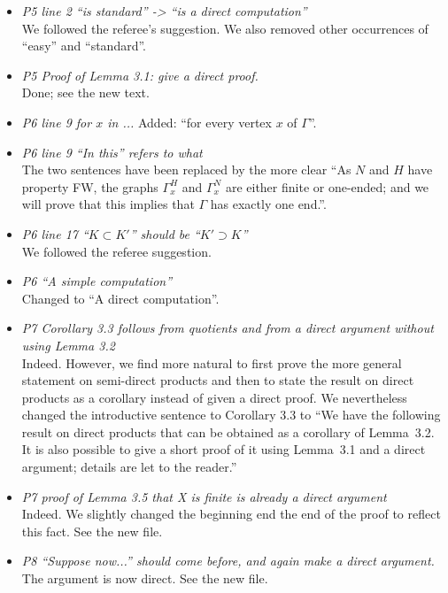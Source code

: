 \documentclass[english,a4paper]{article}
\begin{document}
\begin{itemize}
%
\item\textit{P5 line 2 “is standard” -> “is a direct computation”}\\
We followed the referee's suggestion. We also removed other occurrences of ``easy'' and ``standard''.
%
\item\textit{P5 Proof of Lemma 3.1: give a direct proof.}\\
Done; see the new text.
%
\item\textit{P6 line 9 for $x$ in ...}
Added: ``for every vertex $x$ of $\Gamma$''.
%
\item\textit{P6 line 9 ``In this'' refers to what}\\
The two sentences have been replaced by the more clear ``As $N$ and $H$ have property FW, the graphs $\Gamma_x^H$ and $\Gamma_x^N$ are either finite or one-ended; and we will prove that this implies that $\Gamma$ has exactly one end.''.
%
\item\textit{P6 line 17 ``$K\subset K'$'' should be ``$K'\supset K$''}\\
We followed the referee suggestion.
%
\item\textit{P6 ``A simple computation''}\\
Changed to ``A direct computation''.
%
\item\textit{P7 Corollary 3.3 follows from quotients and from a direct argument without using Lemma 3.2}\\
Indeed. However, we find more natural to first prove the more general statement on semi-direct products and then to state the result on direct products as a corollary instead of given a direct proof. We nevertheless changed the introductive sentence to Corollary 3.3 to ``We have the following result on direct products that can be obtained as a corollary of Lemma~3.2. It is also possible to give a short proof of it using Lemma~3.1 and a direct argument; details are let to the reader.''
%
\item\textit{P7 proof of Lemma 3.5 that X is finite is already a direct argument}\\
Indeed. We slightly changed the beginning end the end of the proof to reflect this fact. See the new file.
%
\item\textit{P8 “Suppose now...” should come before, and again make a direct argument.}\\
The argument is now direct. See the new file.
\end{itemize}
\end{document}
